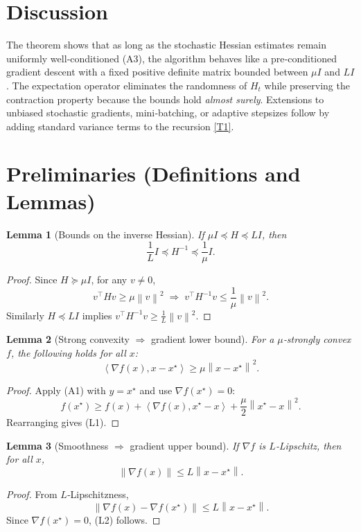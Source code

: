 \documentclass{article}
\newtheorem{lemma}{Lemma}
\newcommand{\norm}[1]{\left\lVert #1\right\rVert}
\newcommand{\ip}[2]{\left\langle #1,#2\right\rangle}
\begin{document}
\section*{Discussion}
The theorem shows that as long as the stochastic Hessian estimates remain uniformly
well‑conditioned (A3), the algorithm behaves like a pre‑conditioned gradient descent
with a fixed positive definite matrix bounded between $\mu I$ and $L I$.  The
expectation operator eliminates the randomness of $H_t$ while preserving the
contraction property because the bounds hold \emph{almost surely}.  Extensions to
unbiased stochastic gradients, mini‑batching, or adaptive stepsizes follow by
adding standard variance terms to the recursion \eqref{T1}.

\newpage
\section*{Preliminaries (Definitions and Lemmas)}
\begin{lemma}[Bounds on the inverse Hessian]\label{lem:inv}
If $\mu I\preceq H\preceq L I$, then
\[
   \frac{1}{L} I\preceq H^{-1}\preceq \frac{1}{\mu} I .
\]
\end{lemma}
\begin{proof}
Since $H\succeq\mu I$, for any $v\neq0$,
\[
   v^{\!\top}Hv\ge\mu\norm{v}^{2}\;\Longrightarrow\;
   v^{\!\top}H^{-1}v\le\frac{1}{\mu}\norm{v}^{2}.
\]
Similarly $H\preceq L I$ implies $v^{\!\top}H^{-1}v\ge\frac{1}{L}\norm{v}^{2}$.
\end{proof}

\begin{lemma}[Strong convexity $\Rightarrow$ gradient lower bound]\label{lem:sc}
For a $\mu$‑strongly convex $f$, the following holds for all $x$:
\[
   \ip{\nabla f(x)}{x-x^{\star}}\ge\mu\norm{x-x^{\star}}^{2}. \tag{L1}
\]
\end{lemma}
\begin{proof}
Apply (A1) with $y=x^{\star}$ and use $\nabla f(x^{\star})=0$:
\[
   f(x^{\star})\ge f(x)+\ip{\nabla f(x)}{x^{\star}-x}+\frac{\mu}{2}\norm{x^{\star}-x}^{2}.
\]
Rearranging gives (L1).
\end{proof}

\begin{lemma}[Smoothness $\Rightarrow$ gradient upper bound]\label{lem:smooth}
If $\nabla f$ is $L$‑Lipschitz, then for all $x$,
\[
   \norm{\nabla f(x)}\le L\norm{x-x^{\star}}. \tag{L2}
\]
\end{lemma}
\begin{proof}
From $L$‑Lipschitzness,
\[
   \norm{\nabla f(x)-\nabla f(x^{\star})}\le L\norm{x-x^{\star}}.
\]
Since $\nabla f(x^{\star})=0$, (L2) follows.
\end{proof}
\end{document}
